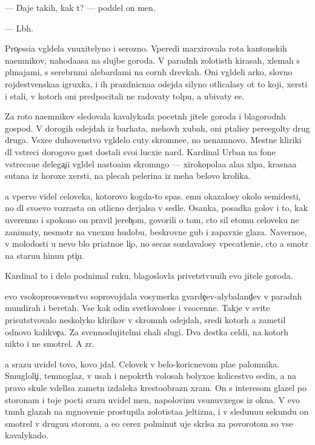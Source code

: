 \documentclass[10pt]{book}
\begin{document}
— Daje takih, kak t{\yi}? — poddel on men{\ia}.

— L{\iu}b{\yi}h.

Pro{\c}essi{\y}a v{\yi}gl{\ia}dela vnuxitelyno i ser{\y}ozno. Vperedi marxirovala rota kantonskih na{\y}emnikov, nahod{\ia}{\x}a{\y}asa na slujbe goroda. V paradn{\yi}h zolotist{\yi}h kirasah, xlemah s pl{\iu}majami, s serebr{\ia}n{\yi}mi alebardami na corn{\yi}h drevkah. Oni v{\yi}gl{\ia}deli {\y}arko, slovno rojdestvenska{\y}a igruxka, i ih prazdnicna{\y}a odejda silyno otlicalasy ot to{\y} koji, xersti i stali, v kotor{\yi}h oni predpocitali ne radovaty tolpu, a ubivaty {\y}e{\y}e.

Za roto{\y} na{\y}emnikov sledovala kavalykada pocetn{\yi}h jitele{\y} goroda i blagorodn{\yi}h gospod. V dorogih odejdah iz barhata, mehov{\yi}h xubah, oni p{\yi}talisy pere{\x}egol{\ia}ty drug druga. V{\yi}sxe{\y}e duhovenstvo v{\yi}gl{\ia}delo cuty skromne{\y}e, no nenamnovo. Mestn{\yi}{\y}e kliriki dl{\ia} vstreci dorogovo gost{\ia} dostali svo{\y}i lucxi{\y}e nar{\ia}d{\yi}. Kardinal Urban na fone vstreca{\y}u{\x}e{\y} delega{\c}i{\y}i v{\yi}gl{\ia}del nasto{\y}a{\x}im skromn{\ia}go{\y} — xirokopola{\y}a ala{\y}a xl{\ia}pa, krasna{\y}a sutana iz horoxe{\y} xersti, na plecah pelerina iz meha belovo krolika.

{\Y}a vperv{\yi}{\y}e videl celoveka, kotorovo kogda-to spas. {\Y}emu okazalosy okolo semides{\ia}ti, no dl{\ia} svo{\y}evo vozrasta on otlicno derjalsa v sedle. Osanka, posadka golov{\yi} i to, kak uverenno i spoko{\y}no on pravil jereb{\c}om, govorili o tom, cto sil etomu celoveku ne zanimaty, nesmotr{\ia} na vnexn{\iu}{\y}u hudobu, beskrovn{\yi}{\y}e gub{\yi} i zapavxi{\y}e glaza. Naverno{\y}e, v molodosti u nevo b{\yi}lo pri{\y}atno{\y}e li{\c}o, no se{\y}cas sozdavalosy vpecatleni{\y}e, cto {\y}a smotr{\iu} na staru{\y}u hi{\x}nu{\y}u pti{\c}u.

Kardinal to i delo podnimal ruku, blagoslovl{\ia}{\y}a privetstvu{\y}u{\x}ih {\y}evo jitele{\y} goroda.

{\Y}evo v{\yi}sokopreosv{\ia}{\x}enstvo soprovojdala vosymerka gvarde{\y}{\c}ev-alybaland{\c}ev v paradn{\yi}h mundirah i beretah. Vse kak odin svetlovolos{\yi}{\y}e i v{\yi}socenn{\yi}{\y}e. Takje v svite prisutstvovalo neskolyko klirikov v skromn{\yi}h odejdah, sredi kotor{\yi}h {\y}a zametil odnovo kalikve{\c}a. Za sv{\ia}{\x}ennoslujitel{\ia}mi {\y}ehali slugi. Dva des{\ia}tka cel{\ia}di, na kotor{\yi}h nikto i ne smotrel. A zr{\ia}.

{\Y}a srazu uvidel tovo, kovo jdal. Celovek v belo-koricnevom pla{\x}e palomnika. Smugloli{\c}i{\y}, temnoglaz{\yi}{\y}, v usah i nepokr{\yi}t{\yi}h volosah bolyxo{\y}e kolicestvo sedin{\yi}, a na pravo{\y} skule v{\yi}del{\ia}lsa zametn{\yi}{\y} izdaleka krestoobrazn{\yi}{\y} xram. On s interesom glazel po storonam i toje pocti srazu uvidel men{\ia}, napolovinu v{\yi}sunuvxegos{\ia} iz okna. V {\y}evo t{\e}mn{\yi}h glazah na mgnoveni{\y}e prostupila zolotista{\y}a jeltizna, i v sledu{\y}u{\x}u{\y}u sekundu on smotrel v drugu{\y}u storonu, a {\y}e{\x}o cerez polminut{\yi} uje skr{\yi}lsa za povorotom so vse{\y} kavalykado{\y}.
\end{document}

